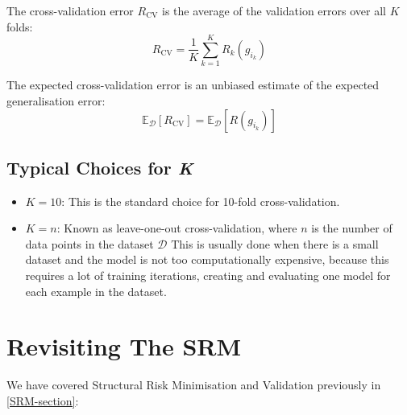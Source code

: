 The cross-validation error $R_{\text{CV}}$ is the average of the validation errors over all $K$ folds:
\begin{equation}
R_{\text{CV}} = \frac{1}{K} \sum_{k=1}^{K} R_k(g_{i_k})
\end{equation}

The expected cross-validation error is an unbiased estimate of the expected generalisation error:
\begin{equation}
\mathbb{E}_{\mathcal{D}} [R_{\text{CV}}] = \mathbb{E}_{\mathcal{D}} [R(g_{i_k})]
\end{equation}

\subsection*{Typical Choices for \textit{K}}
\begin{itemize}
    \item $K = 10$: This is the standard choice for 10-fold cross-validation.
    \item $K = n$: Known as leave-one-out cross-validation, where $n$ is the number of data points in the dataset $\mathcal{D}$ This is usually done when there is a small dataset and the model is not too computationally expensive, because this requires a lot of training iterations, creating and evaluating one model for each example in the dataset.
\end{itemize}

\section{Revisiting The SRM}

We have covered Structural Risk Minimisation and Validation previously in \ref{SRM-section}:

